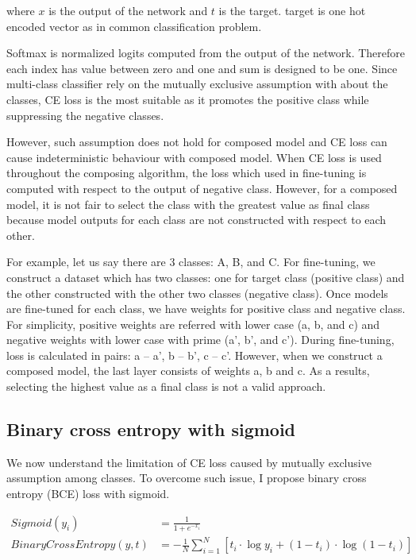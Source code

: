 \documentclass{article}
\begin{document}
where $x$ is the output of the network and $t$ is the target. target is one hot encoded vector as in common classification problem.

Softmax is normalized logits computed from the output of the network. Therefore each index has value between zero and one and sum is designed to be one. Since multi-class classifier rely on the mutually exclusive assumption with about the classes, CE loss is the most suitable as it promotes the positive class while suppressing the negative classes.

However, such assumption does not hold for composed model and CE loss can cause indeterministic behaviour with composed model. When CE loss is used throughout the composing algorithm, the loss which used in fine-tuning is computed with respect to the output of negative class. However, for a composed model, it is not fair to select the class with the greatest value as final class because model outputs for each class are not constructed with respect to each other.

For example, let us say there are 3 classes: A, B, and C. For fine-tuning, we construct a dataset which has two classes: one for target class (positive class) and the other constructed with the other two classes (negative class). Once models are fine-tuned for each class, we have weights for positive class and negative class. For simplicity, positive weights are referred with lower case (a, b, and c) and negative weights with lower case with prime (a', b', and c'). During fine-tuning, loss is calculated in pairs: a -- a', b -- b', c -- c'. However, when we construct a composed model, the last layer consists of weights a, b and c. As a results, selecting the highest value as a final class is not a valid approach.

\subsection{Binary cross entropy with sigmoid}

We now understand the limitation of CE loss caused by mutually exclusive assumption among classes. To overcome such issue, I propose binary cross entropy (BCE) loss with sigmoid.

\begin{align*}
Sigmoid(y_i) &= \frac{1}{1 + e^{-x_i}} \\
BinaryCrossEntropy(y, t) & = -\frac{1}{N}\sum_{i=1}^N \left[ t_i \cdot \log y_i + (1 - t_i) \cdot \log (1 - t_i) \right] \\
\end{align*}
\end{document}
